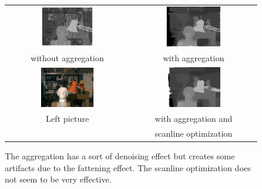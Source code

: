 \documentclass{ipol}
\begin{document}
\begin{figure}[h]
\begin{center}	
\begin{tabular}{cc}
\includegraphics[width=0.45\textwidth]{Images/tsukuba/disparity_map_ADCensus_only.png} & 
\includegraphics[width=0.45\textwidth]{Images/tsukuba/disparity_map_ADCensus_aggregated.png}
\\
without aggregation & with aggregation \\
\includegraphics[width=0.45\textwidth]{Images/pictures/tsukuba.png} &
\includegraphics[width=0.45\textwidth]{Images/tsukuba/disparity_map_ADCensus_aggregated_so.png}
\\
Left picture & with aggregation and \\
& scanline optimization
\end{tabular}
	\caption{The aggregation has a sort of denoising effect but creates some artifacts due to the fattening effect. The scanline optimization does not seem to be very effective.}
	\label{soPics}
\end{center}
\end{figure}
\end{document}
